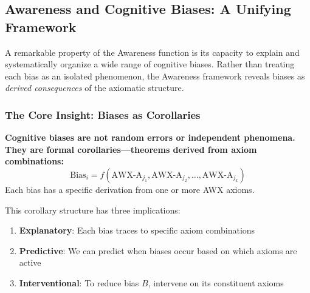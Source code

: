 \subsection{Awareness and Cognitive Biases: A Unifying Framework}
\label{subsec:11-9-biases}


A remarkable property of the Awareness function is its capacity to explain
and systematically organize a wide range of cognitive biases. Rather than
treating each bias as an isolated phenomenon, the Awareness framework reveals
biases as \emph{derived consequences} of the axiomatic structure.

\subsubsection{The Core Insight: Biases as Corollaries}

\begin{tcolorbox}[colback=blue!5!white, colframe=blue!75!black, title=Central Thesis]
\textbf{Cognitive biases are not random errors or independent phenomena. They are formal corollaries---theorems derived from axiom combinations:}
\begin{equation}
\text{Bias}_i = f(\text{AWX-A}_{j_1}, \text{AWX-A}_{j_2}, \ldots, \text{AWX-A}_{j_k})
\end{equation}
Each bias has a specific derivation from one or more AWX axioms.
\end{tcolorbox}

This corollary structure has three implications:
\begin{enumerate}
\item \textbf{Explanatory}: Each bias traces to specific axiom combinations
\item \textbf{Predictive}: We can predict when biases occur based on which axioms are active
\item \textbf{Interventional}: To reduce bias $B$, intervene on its constituent axioms
\end{enumerate}

